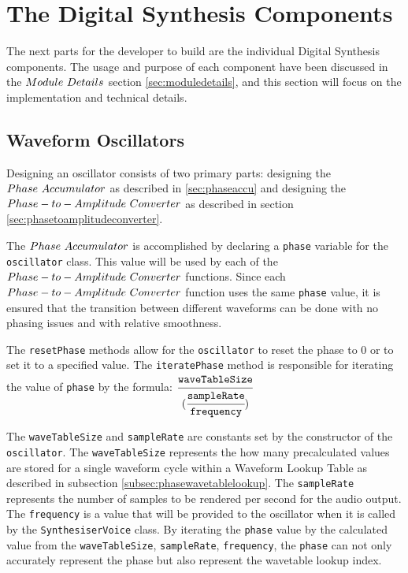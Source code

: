 \documentclass[a4paper,12pt]{report}
\begin{document}
\section{The Digital Synthesis Components}
\label{sec:digitalsynthesiscomponents}
The next parts for the developer to build are the individual Digital Synthesis components. The usage and purpose of each component have been discussed in the $Module\ \-Details$ section \ref{sec:moduledetails}, and this section will focus on the implementation and technical details.

\subsection{Waveform Oscillators}
\label{subsec:waveformosc}
Designing an oscillator consists of two primary parts: designing the $Phase\ \-Accumulator$ as described in \ref{sec:phaseaccu} and designing the $Phase-to-Amplitude\ \-Converter$ as described in section \ref{sec:phasetoamplitudeconverter}.

The $Phase\ \-Accumulator$ is accomplished by declaring a \texttt{phase} variable for the \texttt{oscillator} class. This value will be used by each of the $Phase-to-Amplitude\ \-Converter$ functions. Since each $Phase-to-Amplitude\ \-Converter$ function uses the same \texttt{phase} value, it is ensured that the transition between different waveforms can be done with no phasing issues and with relative smoothness.

The \texttt{resetPhase} methods allow for the \texttt{oscillator} to reset the phase to $0$ or to set it to a specified value. The \texttt{iteratePhase} method is responsible for iterating the value of \texttt{phase} by the formula: \begin{math}
\cfrac{\texttt{waveTableSize}}{(\cfrac{\texttt{sampleRate}}{\texttt{frequency}})}
\end{math}

The \texttt{wave\-Table\-Size} and \texttt{sample\-Rate} are constants set by the constructor of the \texttt{oscillator}. The \texttt{wave\-Table\-Size} represents the how many precalculated values are stored for a single waveform cycle within a Waveform Lookup Table as described in subsection \ref{subsec:phasewavetablelookup}. The \texttt{sample\-Rate} represents the number of samples to be rendered per second for the audio output. The \texttt{frequency} is a value that will be provided to the oscillator when it is called by the \texttt{Synthesiser\-Voice} class. By iterating the \texttt{phase} value by the calculated value from the \texttt{wave\-Table\-Size}, \texttt{sample\-Rate}, \texttt{frequency}, the \texttt{phase} can not only accurately represent the phase but also represent the wavetable lookup index.
\end{document}
